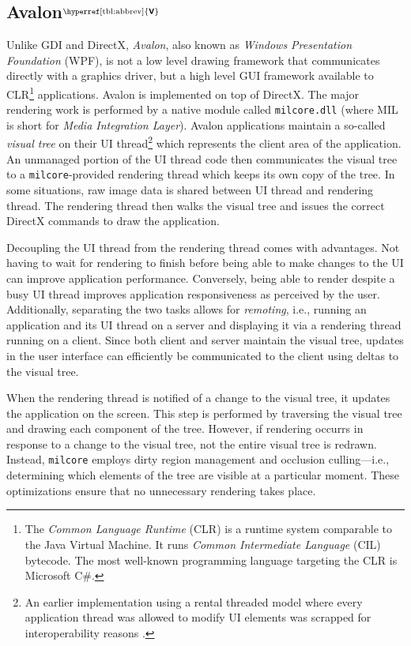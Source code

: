 \documentclass[10pt,twocolumn,a4paper]{article}
\newcommand{\bs}[1]{\textbf{\sffamily #1}}
\newcommand{\winver}[1]{$^{\text{\hyperref[tbl:abbrev]{\bs{#1}}}}$}
\newcommand{\winsubsection}[2]{\subsection[#1]{#1\winver{#2}}}
\begin{document}
		\winsubsection{Avalon}{V}\label{sec:milcore}
			Unlike GDI and DirectX, \textit{Avalon}, also known as \textit{Windows Presentation
			Foundation} (WPF),
			is not a low level drawing framework
			that communicates directly with a graphics driver, but a
			high level GUI framework available to CLR\footnote{The \textit{Common
			Language Runtime} (CLR) is a runtime system comparable to the Java Virtual
			Machine. It runs \textit{Common Intermediate Language} (CIL) bytecode.
			The most well-known programming language targeting the CLR is Microsoft
			C\#.} applications. Avalon is
			implemented on top of DirectX. The major rendering work is performed
			by a native module called \texttt{milcore.dll} (where MIL is short for
			\textit{Media Integration Layer}). Avalon applications maintain a
			so-called \textit{visual tree} on their UI thread\footnote{An
			earlier implementation using a rental threaded model where every
			application thread was allowed to modify UI elements was scrapped
			for interoperability reasons \cite{goingdeep}.} which represents the
			client area of the application. An unmanaged portion of the UI thread
			code then communicates the visual tree to a \texttt{milcore}-provided
			rendering thread which keeps its own copy of the tree. In some situations,
			raw image data is shared between UI thread and rendering thread. The
			rendering thread then walks the visual tree and issues the correct
			DirectX commands to draw the application.
			\cite{goingdeep,dwmwpf}

			Decoupling the UI thread from the rendering thread comes with
			advantages. Not having to wait for rendering to finish before being
			able to make changes to the UI can improve application performance.
			Conversely, being able to render despite a busy UI thread improves
			application responsiveness as perceived by the user. Additionally,
			separating the two tasks allows for \textit{remoting}, i.e., running
			an application and its UI thread on a server and displaying it
			via a rendering thread running on a client. Since both client and
			server maintain the visual tree, updates in the user interface can
			efficiently be communicated to the client using deltas to the visual
			tree.
			\cite{goingdeep}

			When the rendering thread is notified of a change to the visual tree,
			it updates the application on the screen. This step is performed by
			traversing the visual tree and drawing each component of the tree.
			However, if rendering occurrs in response to a change to the visual
			tree, not the entire visual tree is redrawn. Instead, \texttt{milcore}
			employs dirty region management and occlusion culling---i.e.,
			determining which elements of the tree are visible at a particular
			moment. These optimizations ensure that no unnecessary rendering takes
			place.
			\cite{goingdeep}
\end{document}
